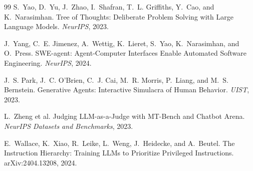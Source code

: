 \documentclass[11pt]{article}
\begin{document}
\begin{thebibliography}{99}
S.~Yao, D.~Yu, J.~Zhao, I.~Shafran, T.~L. Griffiths, Y.~Cao, and K.~Narasimhan.
\newblock Tree of Thoughts: Deliberate Problem Solving with Large Language Models.
\newblock \emph{NeurIPS}, 2023.

J.~Yang, C.~E. Jimenez, A.~Wettig, K.~Lieret, S.~Yao, K.~Narasimhan, and O.~Press.
\newblock SWE-agent: Agent-Computer Interfaces Enable Automated Software
  Engineering.
\newblock \emph{NeurIPS}, 2024.

J.~S. Park, J.~C. O'Brien, C.~J. Cai, M.~R. Morris, P.~Liang, and M.~S. Bernstein.
\newblock Generative Agents: Interactive Simulacra of Human Behavior.
\newblock \emph{UIST}, 2023.

L.~Zheng et al.
\newblock Judging LLM-as-a-Judge with MT-Bench and Chatbot Arena.
\newblock \emph{NeurIPS Datasets and Benchmarks}, 2023.

E.~Wallace, K.~Xiao, R.~Leike, L.~Weng, J.~Heidecke, and A.~Beutel.
\newblock The Instruction Hierarchy: Training LLMs to Prioritize Privileged
  Instructions.
\newblock arXiv:2404.13208, 2024.

\end{thebibliography}
\end{document}
